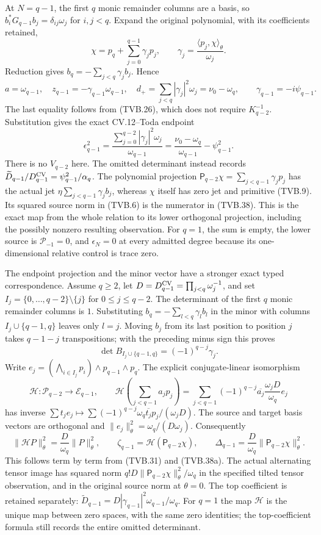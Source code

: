 At $N=q-1$, the first $q$ monic remainder columns are a basis,
so $b_i^*G_{q-1}b_j=\delta_{ij}\omega_j$ for $i,j<q$.
Expand the original polynomial, with its coefficients retained,
\[
 \chi=p_q+\sum_{j=0}^{q-1}\gamma_jp_j,\qquad
 \gamma_j=\frac{\langle p_j,\chi\rangle_\theta}{\omega_j}.
 \tag{TVB.37}
\]
Reduction gives $b_q=-\sum_{j<q}\gamma_jb_j$. Hence
\[
 a=\omega_{q-1},\quad z_{q-1}=-\gamma_{q-1}\omega_{q-1},\quad
 d_+=\sum_{j<q}|\gamma_j|^2\omega_j=\nu_0-\omega_q,
 \qquad\gamma_{q-1}=-i\psi_{q-1}.
\]
The last equality follows from (TVB.26), which does not require
$K_{q-2}^{-1}$. Substitution gives the exact CV.12--Toda endpoint
\[
 \boxed{\epsilon_{q-1}^2
 =\frac{\sum_{j=0}^{q-2}|\gamma_j|^2\omega_j}{\omega_{q-1}}
 =\frac{\nu_0-\omega_q}{\omega_{q-1}}-\psi_{q-1}^2.}
 \tag{TVB.38}
\]
There is no $V_{q-2}$ here. The omitted determinant instead records
$\widetilde D_{q-1}/D_{q-1}^{\rm CV}=\psi_{q-1}^2/\alpha_q$.
The polynomial projection
$\mathsf P_{q-2}\chi=\sum_{j<q-1}\gamma_jp_j$ has the actual
jet $\eta\sum_{j<q-1}\gamma_jb_j$, whereas $\chi$ itself has
zero jet and primitive (TVB.9). Its squared source norm in (TVB.6)
is the numerator in (TVB.38). This is the exact map from the
whole relation to its lower orthogonal projection, including the
possibly nonzero resulting observation.
For $q=1$, the sum is empty, the lower source is $\mathcal P_{-1}=0$,
and $\epsilon_N=0$ at every admitted degree because its one-dimensional
relative control is trace zero.

The endpoint projection and the minor vector have a stronger exact
typed correspondence. Assume $q\ge2$, let
$D=D_{q-1}^{\rm CV}=\prod_{j<q}\omega_j^{-1}$, and set
$I_j=\{0,\ldots,q-2\}\setminus\{j\}$ for $0\le j\le q-2$.
The determinant of the first $q$ monic remainder columns is $1$.
Substituting $b_q=-\sum_{l<q}\gamma_lb_l$ in the minor with columns
$I_j\cup\{q-1,q\}$ leaves only $l=j$. Moving $b_j$ from its
last position to position $j$ takes $q-1-j$ transpositions; with
the preceding minus sign this proves
\[
 \det B_{I_j\cup\{q-1,q\}}=(-1)^{q-j}\gamma_j.
 \tag{TVB.38a}
\]
Write
$e_j=(\bigwedge_{i\in I_j}p_i)\wedge p_{q-1}\wedge p_q$.
The explicit conjugate-linear isomorphism
\[
 \mathcal H:\mathcal P_{q-2}\longrightarrow\mathcal E_{q-1},\qquad
 \mathcal H\left(\sum_{j<q-1}a_jp_j\right)
   =\sum_{j<q-1}(-1)^{q-j}\overline{a_j}
                 \frac{\omega_jD}{\omega_q}e_j
 \tag{TVB.38b}
\]
has inverse $\sum t_je_j\mapsto
\sum(-1)^{q-j}\omega_q\overline{t_j}p_j/(\omega_jD)$.
The source and target basis vectors are orthogonal and
$\|e_j\|_\theta^2=\omega_q/(D\omega_j)$. Consequently
\[
 \|\mathcal HP\|_\theta^2=\frac D{\omega_q}\|P\|_\theta^2,
 \qquad\zeta_{q-1}=\mathcal H(\mathsf P_{q-2}\chi),\qquad
 \Delta_{q-1}=\frac D{\omega_q}\|\mathsf P_{q-2}\chi\|_\theta^2.
 \tag{TVB.38c}
\]
This follows term by term from (TVB.31) and (TVB.38a).
The actual alternating tensor image has squared norm
$q!D\|\mathsf P_{q-2}\chi\|_\theta^2/\omega_q$ in the
specified tilted tensor observation, and in the original source
norm at $\theta=0$. The top coefficient is retained separately:
$\widetilde D_{q-1}
 =D|\gamma_{q-1}|^2\omega_{q-1}/\omega_q$.
For $q=1$ the map $\mathcal H$ is the unique map between zero
spaces, with the same zero identities; the top-coefficient formula
still records the entire omitted determinant.

